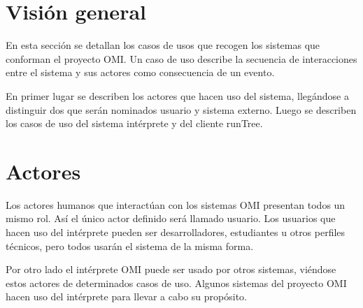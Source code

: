 \section{Visión general}
En esta sección se detallan los casos de usos que recogen los sistemas que conforman el proyecto OMI. 
Un caso de uso describe la secuencia de  interacciones entre el sistema y sus
actores como consecuencia de un evento. 

En primer lugar se describen los actores que hacen uso del sistema, llegándose a distinguir dos que serán nominados 
usuario y sistema externo. Luego se describen los casos de uso del sistema intérprete y del cliente runTree. 

\section{Actores}
Los actores humanos que interactúan con los sistemas OMI presentan todos un mismo rol. Así el 
único actor definido será llamado usuario.  Los usuarios que hacen uso del intérprete pueden ser desarrolladores,
estudiantes u otros perfiles técnicos, pero todos usarán el sistema de la misma forma.

Por otro lado el intérprete OMI puede ser usado por otros sistemas, viéndose estos actores de determinados casos
de uso. Algunos sistemas del proyecto OMI hacen uso del intérprete para llevar  a cabo su propósito.

